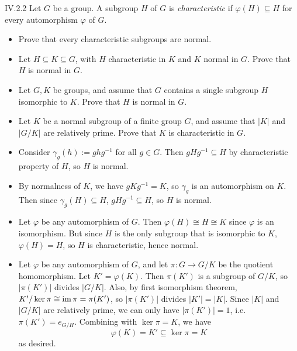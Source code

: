 \begin{problem}{IV.2.2}
Let $G$ be a group. A subgroup $H$ of $G$ is \emph{characteristic} if $\varphi(H) \subseteq H$ for every automorphism $\varphi$ of $G$.
\begin{itemize}
    \setlength\itemsep{0pc}
    \item Prove that every characteristic subgroups are normal.
    \item Let $H \subseteq K \subseteq G$, with $H$ characteristic in $K$ and $K$ normal in $G$. Prove that $H$ is normal in $G$. 
    \item Let $G,K$ be groups, and assume that $G$ contains a single subgroup $H$ isomorphic to $K$. Prove that $H$ is normal in $G$.
    \item Let $K$ be a normal subgroup of a finite group $G$, and assume that $|K|$ and $|G/K|$ are relatively prime. Prove that $K$ is characteristic in $G$.
\end{itemize} 
\end{problem}
\begin{pf}
\begin{itemize}
    \setlength\itemsep{0pt}
    \item Consider $\gamma_g(h) := ghg^{-1}$ for all $g \in G$. Then $gHg^{-1} \subseteq H$ by characteristic property of $H$, so $H$ is normal.
    \item By normalness of $K$, we have $gKg^{-1} = K$, so $\gamma_g$ is an automorphism on $K$. Then since $\gamma_g(H) \subseteq H$, $gHg^{-1} \subseteq H$, so $H$ is normal.
    \item Let $\varphi$ be any automorphism of $G$. Then $\varphi(H) \cong H \cong K$ since $\varphi$ is an isomorphism. But since $H$ is the only subgroup that is isomorphic to $K$, $\varphi(H) = H$, so $H$ is characteristic, hence normal. 
    \item Let $\varphi$ be any automorphism of $G$, and let $\pi : G \to G/K$ be the quotient homomorphism.	Let $K' = \varphi(K)$. Then $\pi(K')$ is a subgroup of $G/K$, so $|\pi(K')|$ divides $|G/K|$. Also, by first isomorphism theorem, $K'/\ker \pi \cong \operatorname{im} \pi = \pi(K')$, so $|\pi(K')|$ divides $|K'| = |K|$. Since $|K|$ and $|G/K|$ are relatively prime, we can only have $|\pi(K')| = 1$, i.e. $\pi(K') = e_{G/H}$. Combining with $\ker \pi = K$, we have
    \[
    \varphi(K) = K' \subseteq \ker \pi = K
    \]
    as desired.
\end{itemize}
\end{pf}


